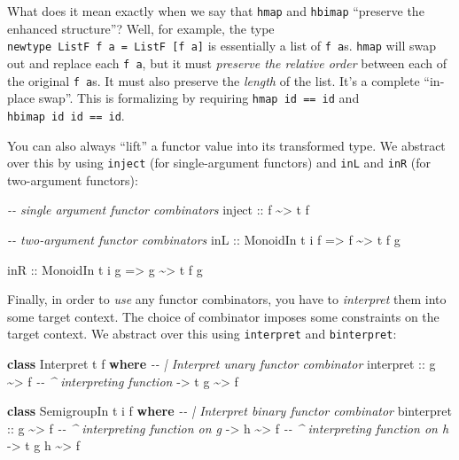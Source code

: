 \documentclass[]{article}
\newenvironment{Shaded}{}{}
\newcommand{\CommentTok}[1]{\textcolor[rgb]{0.38,0.63,0.69}{\textit{#1}}}
\newcommand{\DataTypeTok}[1]{\textcolor[rgb]{0.56,0.13,0.00}{#1}}
\newcommand{\KeywordTok}[1]{\textcolor[rgb]{0.00,0.44,0.13}{\textbf{#1}}}
\newcommand{\NormalTok}[1]{#1}
\newcommand{\OperatorTok}[1]{\textcolor[rgb]{0.40,0.40,0.40}{#1}}
\newcommand{\OtherTok}[1]{\textcolor[rgb]{0.00,0.44,0.13}{#1}}
\begin{document}
What does it mean exactly when we say that \texttt{hmap} and \texttt{hbimap}
``preserve the enhanced structure''? Well, for example, the type
\texttt{newtype\ ListF\ f\ a\ =\ ListF\ {[}f\ a{]}} is essentially a list of
\texttt{f\ a}s. \texttt{hmap} will swap out and replace each \texttt{f\ a}, but
it must \emph{preserve the relative order} between each of the original
\texttt{f\ a}s. It must also preserve the \emph{length} of the list. It's a
complete ``in-place swap''. This is formalizing by requiring
\texttt{hmap\ id\ ==\ id} and \texttt{hbimap\ id\ id\ ==\ id}.

You can also always ``lift'' a functor value into its transformed type. We
abstract over this by using \texttt{inject} (for single-argument functors) and
\texttt{inL} and \texttt{inR} (for two-argument functors):

\begin{Shaded}
\begin{Highlighting}[]
\CommentTok{{-}{-} single argument functor combinators}
\OtherTok{inject ::}\NormalTok{ f }\OperatorTok{\textasciitilde{}>}\NormalTok{ t f}

\CommentTok{{-}{-} two{-}argument functor combinators}
\OtherTok{inL ::} \DataTypeTok{MonoidIn}\NormalTok{ t i f}
    \OtherTok{=>}\NormalTok{ f }\OperatorTok{\textasciitilde{}>}\NormalTok{ t f g}

\OtherTok{inR ::} \DataTypeTok{MonoidIn}\NormalTok{ t i g}
    \OtherTok{=>}\NormalTok{ g }\OperatorTok{\textasciitilde{}>}\NormalTok{ t f g}
\end{Highlighting}
\end{Shaded}

Finally, in order to \emph{use} any functor combinators, you have to
\emph{interpret} them into some target context. The choice of combinator imposes
some constraints on the target context. We abstract over this using
\texttt{interpret} and \texttt{binterpret}:

\begin{Shaded}
\begin{Highlighting}[]
\KeywordTok{class} \DataTypeTok{Interpret}\NormalTok{ t f }\KeywordTok{where}
    \CommentTok{{-}{-} | Interpret unary functor combinator}
\NormalTok{    interpret}
\OtherTok{        ::}\NormalTok{ g }\OperatorTok{\textasciitilde{}>}\NormalTok{ f             }\CommentTok{{-}{-} \^{} interpreting function}
        \OtherTok{{-}>}\NormalTok{ t g }\OperatorTok{\textasciitilde{}>}\NormalTok{ f}

\KeywordTok{class} \DataTypeTok{SemigroupIn}\NormalTok{ t i f }\KeywordTok{where}
    \CommentTok{{-}{-} | Interpret binary functor combinator}
\NormalTok{    binterpret}
\OtherTok{        ::}\NormalTok{ g }\OperatorTok{\textasciitilde{}>}\NormalTok{ f             }\CommentTok{{-}{-} \^{} interpreting function on g}
        \OtherTok{{-}>}\NormalTok{ h }\OperatorTok{\textasciitilde{}>}\NormalTok{ f             }\CommentTok{{-}{-} \^{} interpreting function on h}
        \OtherTok{{-}>}\NormalTok{ t g h }\OperatorTok{\textasciitilde{}>}\NormalTok{ f}
\end{Highlighting}
\end{Shaded}
\end{document}
